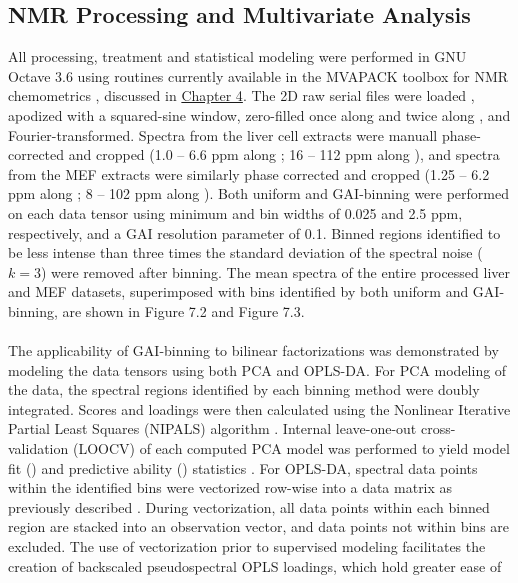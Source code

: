 \subsection{NMR Processing and Multivariate Analysis}

\begin{doublespace}
All processing, treatment and statistical modeling were performed in GNU Octave
3.6 \cite{eaton2008} using routines currently available in the MVAPACK
toolbox for NMR chemometrics \cite{worley:acscb2014}, discussed in
\hyperlink{chapter.4}{Chapter 4}. The 2D raw serial files were loaded
\cite{delaglio:jbnmr1995}, apodized with a squared-sine window,
zero-filled once along \hnmr{} and twice along \cnmr{}, and
Fourier-transformed. Spectra from the liver cell extracts were manuall
phase-corrected and cropped (1.0 -- 6.6 ppm along \hnmr{}; 16 -- 112 ppm
along \cnmr{}), and spectra from the MEF extracts were similarly phase
corrected and cropped (1.25 -- 6.2 ppm along \hnmr{}; 8 -- 102 ppm
along \cnmr{}). Both uniform and GAI-binning were performed on each data tensor
using minimum \hnmr{} and \cnmr{} bin widths of 0.025 and 2.5
ppm, respectively, and a GAI resolution parameter of 0.1. Binned regions
identified to be less intense than three times the standard deviation of the
spectral noise ($k = 3$) were removed after binning. The mean spectra of the
entire processed liver and MEF datasets, superimposed with bins identified by
both uniform and GAI-binning, are shown in Figure 7.2 and Figure 7.3.
\\\\
The applicability of GAI-binning to bilinear factorizations was demonstrated
by modeling the data tensors using both PCA and OPLS-DA. For PCA modeling of
the data, the spectral regions identified by each binning method were doubly
integrated. Scores and loadings were then calculated using the Nonlinear
Iterative Partial Least Squares (NIPALS) algorithm
\cite{jolliffe2002}. Internal leave-one-out cross-validation (LOOCV)
of each computed PCA model was performed to yield model fit (\rsqx{}) and
predictive ability (\qsq{}) statistics
\cite{krzanowski:biom1987,eshghi:cils2014}. For OPLS-DA, spectral data
points within the identified bins were vectorized row-wise into a data matrix
as previously described \cite{hedenstrom:cils2008}. During
vectorization, all data points within each binned region are stacked into an
observation vector, and data points not within bins are excluded. The use of
vectorization prior to supervised modeling facilitates the creation of
backscaled pseudospectral OPLS loadings, which hold greater ease of

\end{doublespace}
